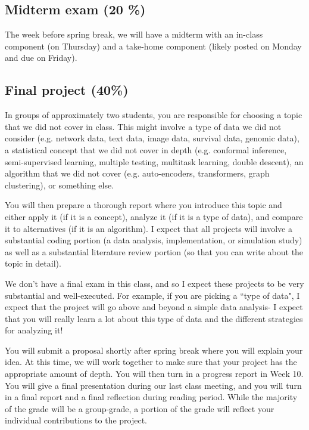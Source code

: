 \documentclass[11pt]{article}
\begin{document}
\subsection{Midterm exam (20 \%)}

The week before spring break, we will have a midterm with an in-class component (on Thursday) and a take-home component (likely posted on Monday and due on Friday). 


\subsection{Final project (40\%)}

In groups of approximately two students, you are responsible for choosing a topic that we did not cover in class. This might involve a type of data we did not consider (e.g. network data, text data, image data, survival data, genomic data), a statistical concept that we did not cover in depth (e.g. conformal inference, semi-supervised learning, multiple testing, multitask learning, double descent), an algorithm that we did not cover (e.g. auto-encoders, transformers, graph clustering), or something else. 

You will then prepare a thorough report where you introduce this topic and either apply it (if it is a concept), analyze it (if it is a type of data), and compare it to alternatives (if it is an algorithm). I expect that all projects will involve a substantial coding portion (a data analysis, implementation, or simulation study) as well as a substantial literature review portion (so that you can write about the topic in detail). 

We don't have a final exam in this class, and so I expect these projects to be very substantial and well-executed. For example, if you are picking a ``type of data", I expect that the project will go above and beyond a simple data analysis- I expect that you will really learn a lot about this type of data and the different strategies for analyzing it!

You will submit a proposal shortly after spring break where you will explain your idea. At this time, we will work together to make sure that your project has the appropriate amount of depth. You will then turn in a progress report in Week 10. You will give a final presentation during our last class meeting, and you will turn in a final report and a final reflection during reading period. While the majority of the grade will be a group-grade, a portion of the grade will reflect your individual contributions to the project. 
\end{document}
